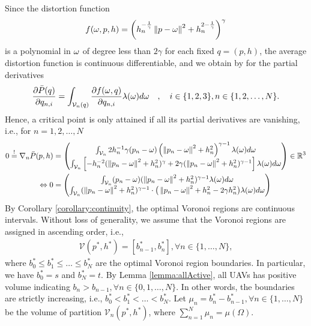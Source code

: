 \documentclass[smallabstract,smallcaptions]{dccpaper}
\newcommand{\df}{\ensuremath{\lam}}         %
\newcommand{\bQ}{\ensuremath{q}}          %
\newcommand{\Pbar}{\ensuremath{\bar{P}}}         %
\newcommand{\Vor}{\ensuremath{\mathcal{V}}}         %
\begin{document}
Since the distortion function 
\begin{align}
  f(\omega,p,h)= \left(h_n^{-\frac{1}{\gamma}} \left\|p-\omega\right\| ^2 + h_n^{2-\frac{1}{\gamma}}\right)^{\gamma}
\end{align}  
is a polynomial in $\omega$ of degree less than $2\gamma$ for each fixed $\bQ=(p,h)$, the average distortion function is continuous
differentiable, and we obtain by \cite[Thm.1]{WJ18} for the partial derivatives 
%
\begin{align}
  \frac{\partial \Pbar(q)}{\partial q_{n,i}} = \int_{\Vor_n(q)} \frac{\partial f(\ome,q)}{\partial q_{n,i}}
  \df(\ome)d\ome\quad,\quad i\in\{1,2,3\},n\in\{1,2,\dots,N\}.
\end{align}
%
Hence, a critical point is only attained if all its partial derivatives are vanishing, i.e.,  for  $n=1,2,\dots,N$ 
%
\begin{align}
 0\overset{!}{=} \nabla_n \Pbar(p,h) &= \begin{pmatrix} 
   \int_{\Vor_n} 2h_n^{-1} \gam (p_{n}-\ome)  \left(\Norm{p_n-\ome}^2 +h_n^2\right)^{\gam-1} 
    \df(\ome)d \ome\\
    \int_{\Vor_n} \left[-h_n^{-2}(\Norm{p_n-\ome}^2 + h_n^2)^{\gam} + 2\gam 
    (\Norm{p_n-\ome}^2 +h_n^2)^{\gam-1}\right]
    \df(\ome)d \ome
  \end{pmatrix} \in\R^3\notag\\
\LRA 0&= \begin{pmatrix}
  \int_{\Vor_n} (p_{n}-\ome) (\Norm{p_n-\ome}^2 +h_n^2)^{\gam-1} \df(\ome)d \ome\\
  \int_{\Vor_n} (\Norm{p_n-\ome}^2 +h_n^2)^{\gam-1}\cdot \big(\Norm{p_n-\ome}^2+h_n^2 - 2\gam h_n^2 \big)
  \df(\ome)d \ome
  \end{pmatrix}\label{eq:gradient}
\end{align}
%
By Corollary \ref{corollary:continuity}, the optimal Voronoi regions are continuous intervals. 
Without loss of generality, we assume that the Voronoi regions are assigned in ascending order, i.e., 
%
\begin{align}
\Vor(p^*, h^*)=[b^*_{n-1}, b^*_n], \forall n\in\{1,\dots,N\},
\label{eq:1DoptV}
\end{align}
%
where $b^*_0\le b^*_1\le\dots\le b^*_N$ are the optimal Voronoi region boundaries. In particular, we have $b^*_0=s$ and $b^*_N=t$.
By Lemma \ref{lemma:allActive}, all UAVs has positive volume indicating $b_n > b_{n-1}, \forall n\in\{0,1,\dots,N\}$.
In other words, the boundaries are strictly increasing, i.e., $b^*_0< b^*_1<\dots< b^*_N$.
Let $\mu_n=b^*_n-b^*_{n-1}, \forall n\in\{1,\dots,N\}$ be the volume of partition $\Vor_n(p^*, h^*)$, where $\sum_{n=1}^{N}\mu_n=\mu(\Omega)$.
\end{document}
